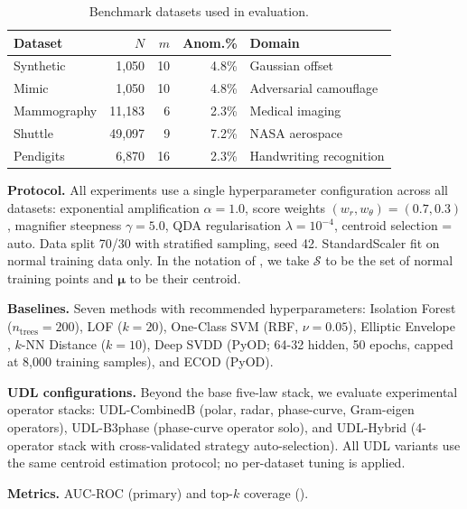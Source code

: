 \documentclass{article}
\newcommand{\Nset}{\mathcal{S}}  %
\begin{document}
\begin{table}[t]
\centering
\caption{Benchmark datasets used in evaluation.}
\label{tab:datasets}
\begin{tabular}{@{}lrrrl@{}}
\toprule
\textbf{Dataset} & $N$ & $m$ & \textbf{Anom.\%} & \textbf{Domain} \\
\midrule
Synthetic & 1{,}050 & 10 & 4.8\% & Gaussian offset \\
Mimic & 1{,}050 & 10 & 4.8\% & Adversarial camouflage \\
Mammography & 11{,}183 & 6 & 2.3\% & Medical imaging \\
Shuttle & 49{,}097 & 9 & 7.2\% & NASA aerospace \\
Pendigits & 6{,}870 & 16 & 2.3\% & Handwriting recognition \\
\bottomrule
\end{tabular}
\end{table}

\textbf{Protocol.} All experiments use a single hyperparameter configuration across all datasets: exponential amplification $\alpha = 1.0$, score weights $(w_r, w_\theta) = (0.7, 0.3)$, magnifier steepness $\gamma = 5.0$, QDA regularisation $\lambda = 10^{-4}$, centroid selection = auto. Data split 70/30 with stratified sampling, seed 42. StandardScaler fit on normal training data only. In the notation of , we take $\Nset$ to be the set of normal training points and $\bm{\mu}$ to be their centroid.

\textbf{Baselines.} Seven methods with recommended hyperparameters: Isolation Forest \citep{liu2008isolation} ($n_{\text{trees}} = 200$), LOF \citep{breunig2000lof} ($k=20$), One-Class SVM \citep{scholkopf2001estimating} (RBF, $\nu=0.05$), Elliptic Envelope \citep{rousseeuw1999fast}, $k$-NN Distance \citep{ramaswamy2000efficient} ($k=10$), Deep SVDD \citep{ruff2018deep} (PyOD; 64-32 hidden, 50 epochs, capped at 8{,}000 training samples), and ECOD \citep{li2022ecod} (PyOD).

\textbf{UDL configurations.} Beyond the base five-law stack, we evaluate experimental operator stacks: UDL-CombinedB (polar, radar, phase-curve, Gram-eigen operators), UDL-B3phase (phase-curve operator solo), and UDL-Hybrid (4-operator stack with cross-validated strategy auto-selection). All UDL variants use the same centroid estimation protocol; no per-dataset tuning is applied.

\textbf{Metrics.} AUC-ROC (primary) and top-$k$ coverage ().
\end{document}
